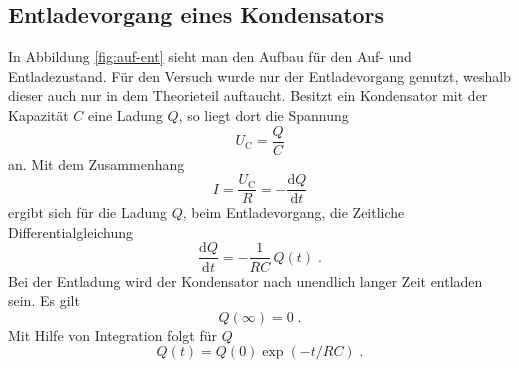 \subsection{Entladevorgang eines Kondensators}
In Abbildung \ref{fig:auf-ent} sieht man den Aufbau für den Auf- und Entladezustand.
Für den Versuch wurde nur der Entladevorgang genutzt, weshalb dieser auch nur in dem Theorieteil auftaucht.
Besitzt ein Kondensator mit der Kapazität $C$ eine Ladung $Q$, so liegt dort die Spannung 
\begin{equation*}
    U_\text{C}=\frac{Q}{C}
\end{equation*}
an. Mit dem Zusammenhang
\begin{equation*}
    I=\frac{U_\text{C}}{R}=- \frac{\text{d}Q}{\text{d}t}
\end{equation*}
ergibt sich für die Ladung $Q$, beim Entladevorgang, die Zeitliche Differentialgleichung
\begin{equation}
    \label{eqn:Q-DGL}
    \frac{\text{d}Q}{\text{d}t}=-\frac{1}{RC}\,Q(t)\; \text{.}
\end{equation}
Bei der Entladung wird der Kondensator nach unendlich langer Zeit entladen sein. Es gilt
\begin{equation*}
    Q(\infty)=0\; \text{.}
\end{equation*}
Mit Hilfe von Integration folgt für $Q$
\begin{equation}
    Q(t)=Q(0)\exp(-t/RC)\; \text{.} \label{eqn:Charge}
\end{equation}
